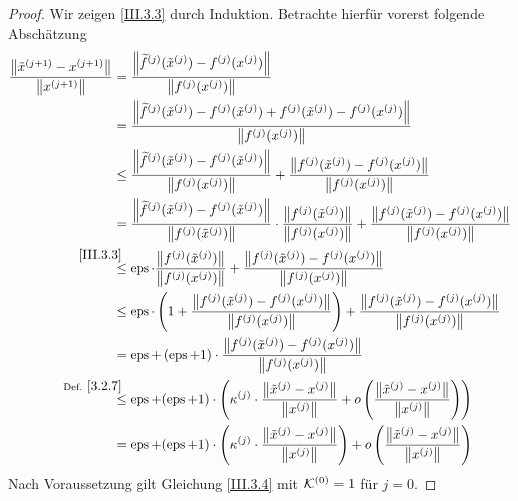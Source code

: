 \begin{Leme}[Fehlerfortpflanzung]
\begin{proof}
  Wir zeigen \ref{III.3.3} durch Induktion.
  Betrachte hierfür vorerst folgende Abschätzung
  \begin{align*}
    \frac{\nn[\tilde{x}^{(j+1)}-x^{(j+1)}]}{\nn[x^{(j+1)}]}
    &= \frac{\nn[\widetilde{f}^{(j)}(\tilde{x}^{(j)})-f^{(j)}(x^{(j)})]}
      {\nn[f^{(j)}(x^{(j)})]} \\
    &= \frac{\nn[\widetilde{f}^{(j)}(\tilde{x}^{(j)})
      -f^{(j)}(\tilde{x}^{(j)})
      +f^{(j)}(\tilde{x}^{(j)})
      -f^{(j)}(x^{(j)})]}
      {\nn[f^{(j)}(x^{(j)})]} \\
    &\leq \frac{\nn[\widetilde{f}^{(j)}(\tilde{x}^{(j)})
      -f^{(j)}(\tilde{x}^{(j)})]}
      {\nn[f^{(j)}(x^{(j)})]}
      +\frac{\nn[f^{(j)}(\tilde{x}^{(j)}) - f^{(j)}(x^{(j)})]}
      {\nn[f^{(j)}(x^{(j)})]} \\
    &= \frac{\nn[\widetilde{f}^{(j)}(\tilde{x}^{(j)})
      -f^{(j)}(\tilde{x}^{(j)})]}
      {\nn[f^{(j)}(\tilde{x}^{(j)})]}
      \cdot \frac{\nn[f^{(j)}(\tilde{x}^{(j)})]}
      {\nn[f^{(j)}(x^{(j)})]}
      +\frac{\nn[f^{(j)}(\tilde{x}^{(j)}) - f^{(j)}(x^{(j)})]}
      {\nn[f^{(j)}(x^{(j)})]} \\
    &\overset{\mathllap{\ref{III.3.3}}}{\leq}
      \Eps\cdot \frac{\nn[f^{(j)}(\tilde{x}^{(j)})]}
      {\nn[f^{(j)}(x^{(j)})]}
      +\frac{\nn[f^{(j)}(\tilde{x}^{(j)})-f^{(j)}(x^{(j)})]}
      {\nn[f^{(j)}(x^{(j)})]} \\
    &\leq \Eps\cdot\left( 
      1 + \frac{\nn[f^{(j)}(\tilde{x}^{(j)})-f^{(j)}(x^{(j)})]}
      {\nn[f^{(j)}(x^{(j)})]}
      \right)
      + \frac{\nn[f^{(j)}(\tilde{x}^{(j)})-f^{(j)}(x^{(j)})]}
      {\nn[f^{(j)}(x^{(j)})]}\\
    &= \Eps + \left( \Eps+1 \right)
      \cdot \frac{\nn[f^{(j)}(\tilde{x}^{(j)})-f^{(j)}(x^{(j)})]}
      {\nn[f^{(j)}(x^{(j)})]}\\      
    &\overset{\mathllap{\text{Def. }\ref{3.2.7}}}{\leq} 
      \Eps + (\Eps+1) \cdot
      \left(
      \kappa^{(j)}\cdot \frac{\nn[\tilde{x}^{(j)}-x^{(j)}]}{\nn[x^{(j)}]}
      + o\left( 
      \frac{\nn[\tilde{x}^{(j)}-x^{(j)}]}{\nn[x^{(j)}]}
      \right)
      \right)\\
    &= \Eps + (\Eps+1) \cdot
      \left(
      \kappa^{(j)}\cdot \frac{\nn[\tilde{x}^{(j)}-x^{(j)}]}{\nn[x^{(j)}]}
      \right)
      + o\left( 
      \frac{\nn[\tilde{x}^{(j)}-x^{(j)}]}{\nn[x^{(j)}]}
      \right)
  \end{align*}
  Nach Voraussetzung gilt Gleichung \eqref{III.3.4}  mit $\mathcal{K}^{(0)}=1$ für $j=0$.

\end{proof}
\end{Leme}
